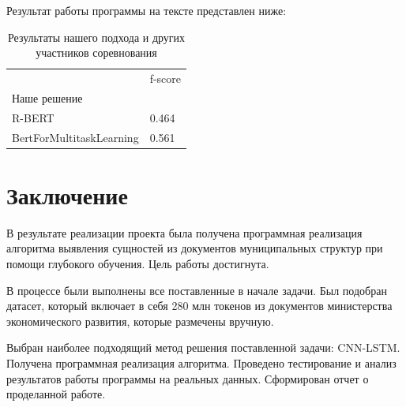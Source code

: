\documentclass{article}
\begin{document}
Результат работы программы на тексте представлен ниже: 

\begin{table}[tbh!]
    \centering
    \begin{tabular}[t]{l|l}
         &  f-score\\
        Наше решение & \\
        R-BERT & 0.464 \\
        BertForMultitaskLearning & 0.561 \\
    \end{tabular}
    \caption{Результаты нашего подхода и других участников соревнования}
    \label{tab:результаты нашего подхода и других участников соревнования}
\end{table}


\section{Заключение}
В результате реализации проекта была получена программная реализация алгоритма выявления сущностей из документов муниципальных структур при помощи глубокого обучения. Цель работы достигнута. 

В процессе были выполнены все поставленные в начале задачи.  Был подобран датасет, который включает в себя 280 млн токенов из документов министерства экономического развития, которые размечены вручную.

 Выбран наиболее подходящий метод решения поставленной задачи: CNN-LSTM.
Получена программная реализация алгоритма. Проведено тестирование и анализ результатов работы программы на реальных данных. Сформирован отчет о проделанной работе.


\end{document}

